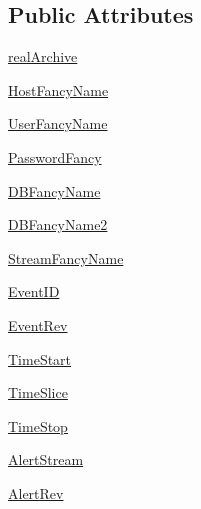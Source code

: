 \subsection*{Public Attributes}
\begin{DoxyCompactItemize}
\item 
\hyperlink{classamonpy_1_1dbase_1_1test_1_1test__db__read_1_1_test_d_b_read_a6700613b2e7f2b5a5f84f8fa3b8e8e3f}{real\-Archive}
\item 
\hyperlink{classamonpy_1_1dbase_1_1test_1_1test__db__read_1_1_test_d_b_read_aef02f233501a4c3d5f1b005a1c0c0d72}{Host\-Fancy\-Name}
\item 
\hyperlink{classamonpy_1_1dbase_1_1test_1_1test__db__read_1_1_test_d_b_read_a9ed55e19e8187469a496695884509101}{User\-Fancy\-Name}
\item 
\hyperlink{classamonpy_1_1dbase_1_1test_1_1test__db__read_1_1_test_d_b_read_af3fe3e1b6f4d40624da8b3168058e355}{Password\-Fancy}
\item 
\hyperlink{classamonpy_1_1dbase_1_1test_1_1test__db__read_1_1_test_d_b_read_af7baa96afc495b6ddf3b2a9c053e6273}{D\-B\-Fancy\-Name}
\item 
\hyperlink{classamonpy_1_1dbase_1_1test_1_1test__db__read_1_1_test_d_b_read_a4ec0f5238616b6faf18b5754b8f708d4}{D\-B\-Fancy\-Name2}
\item 
\hyperlink{classamonpy_1_1dbase_1_1test_1_1test__db__read_1_1_test_d_b_read_ac7f82aeb05869690ebcd4c7619117943}{Stream\-Fancy\-Name}
\item 
\hyperlink{classamonpy_1_1dbase_1_1test_1_1test__db__read_1_1_test_d_b_read_aab94ea32aa54e6d2cca5f68e1387be51}{Event\-I\-D}
\item 
\hyperlink{classamonpy_1_1dbase_1_1test_1_1test__db__read_1_1_test_d_b_read_a6f44b33da586a4e0dfba810ab1692852}{Event\-Rev}
\item 
\hyperlink{classamonpy_1_1dbase_1_1test_1_1test__db__read_1_1_test_d_b_read_aec46e79a01fcb17284df6e0ccf8af8fc}{Time\-Start}
\item 
\hyperlink{classamonpy_1_1dbase_1_1test_1_1test__db__read_1_1_test_d_b_read_aa69e0701a1ef6f93dc6053a6cad634dd}{Time\-Slice}
\item 
\hyperlink{classamonpy_1_1dbase_1_1test_1_1test__db__read_1_1_test_d_b_read_a3ee527a724daeb372b8fe60472ba5ce4}{Time\-Stop}
\item 
\hyperlink{classamonpy_1_1dbase_1_1test_1_1test__db__read_1_1_test_d_b_read_a762f69bcd3574f95324c3874f7712b6b}{Alert\-Stream}
\item 
\hyperlink{classamonpy_1_1dbase_1_1test_1_1test__db__read_1_1_test_d_b_read_ab8058162f86c23241a86b9c23671aa26}{Alert\-Rev}

\end{DoxyCompactItemize}

